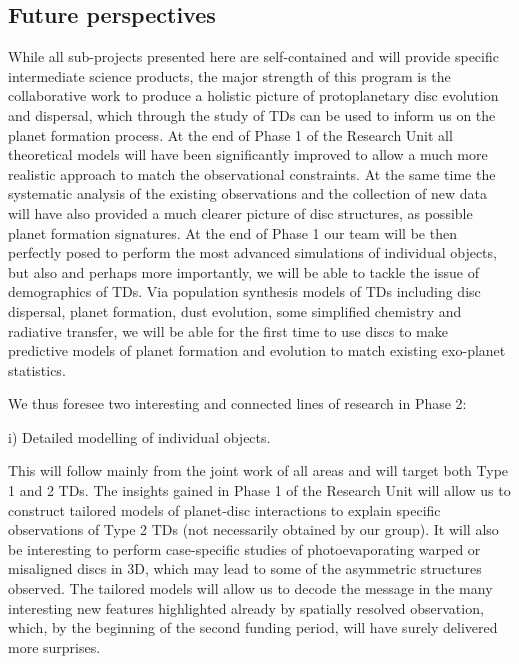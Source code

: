 \documentclass[10pt,fleqn,twoside]{article}
\begin{document}
\subsection{Future perspectives}
%
While all sub-projects presented here are self-contained and will
provide specific intermediate science products, the major strength of this program is the collaborative
work to produce a holistic picture of protoplanetary disc evolution
and dispersal, which through the study of TDs can be used
to inform us on the planet formation process. At the end of Phase 1 of
the Research Unit all theoretical models will have been significantly
improved to allow a much more realistic approach to match the
observational constraints. At the same time the systematic analysis of
the existing observations and the collection of new data will have also
provided a much clearer picture of disc structures, as possible planet
formation signatures. At the end of Phase 1 our team will be then
perfectly posed to perform the most advanced simulations of individual
objects, but also and perhaps more importantly, we will be able to
tackle the issue of demographics of TDs. Via population
synthesis models of TDs including disc dispersal, planet formation, dust
evolution, some simplified chemistry and radiative transfer, we will
be able for the first time to use discs to make predictive models of
planet formation and evolution to match existing exo-planet
statistics. 

\begin{highlight}
We thus foresee two interesting and connected lines of research in Phase 2: 
\end{highlight}

\begin{Emphasize}
i) Detailed modelling of individual objects.\\
\end{Emphasize}
This will follow mainly from the joint work of all areas and will
target both Type 1 and 2 TDs. The insights gained in
Phase 1 of the Research Unit will allow us to construct tailored
models of planet-disc interactions to explain specific observations of
Type 2 TDs (not necessarily obtained by our group). It will also be
interesting to perform case-specific studies of photoevaporating
warped or misaligned discs in 3D, which may
lead to some of the asymmetric structures observed. The tailored
models will allow us to decode the message in the many interesting new
features highlighted already by spatially resolved observation, which,
by the beginning of the second funding period, will have surely
delivered more surprises.  
\end{document}
